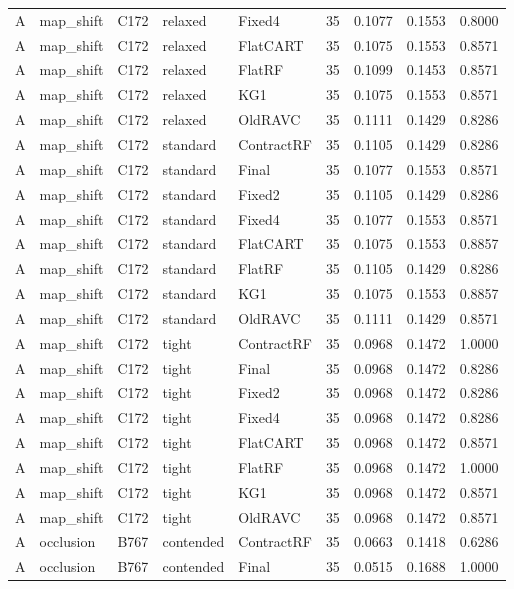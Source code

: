 \begin{longtable}{@{}lllllllll@{}}
A & map\_shift & C172 & relaxed & Fixed4 & 35 & 0.1077 & 0.1553 & 0.8000\\
A & map\_shift & C172 & relaxed & FlatCART & 35 & 0.1075 & 0.1553 & 0.8571\\
A & map\_shift & C172 & relaxed & FlatRF & 35 & 0.1099 & 0.1453 & 0.8571\\
A & map\_shift & C172 & relaxed & KG1 & 35 & 0.1075 & 0.1553 & 0.8571\\
A & map\_shift & C172 & relaxed & OldRAVC & 35 & 0.1111 & 0.1429 & 0.8286\\
A & map\_shift & C172 & standard & ContractRF & 35 & 0.1105 & 0.1429 & 0.8286\\
A & map\_shift & C172 & standard & Final & 35 & 0.1077 & 0.1553 & 0.8571\\
A & map\_shift & C172 & standard & Fixed2 & 35 & 0.1105 & 0.1429 & 0.8286\\
A & map\_shift & C172 & standard & Fixed4 & 35 & 0.1077 & 0.1553 & 0.8571\\
A & map\_shift & C172 & standard & FlatCART & 35 & 0.1075 & 0.1553 & 0.8857\\
A & map\_shift & C172 & standard & FlatRF & 35 & 0.1105 & 0.1429 & 0.8286\\
A & map\_shift & C172 & standard & KG1 & 35 & 0.1075 & 0.1553 & 0.8857\\
A & map\_shift & C172 & standard & OldRAVC & 35 & 0.1111 & 0.1429 & 0.8571\\
A & map\_shift & C172 & tight & ContractRF & 35 & 0.0968 & 0.1472 & 1.0000\\
A & map\_shift & C172 & tight & Final & 35 & 0.0968 & 0.1472 & 0.8286\\
A & map\_shift & C172 & tight & Fixed2 & 35 & 0.0968 & 0.1472 & 0.8286\\
A & map\_shift & C172 & tight & Fixed4 & 35 & 0.0968 & 0.1472 & 0.8286\\
A & map\_shift & C172 & tight & FlatCART & 35 & 0.0968 & 0.1472 & 0.8571\\
A & map\_shift & C172 & tight & FlatRF & 35 & 0.0968 & 0.1472 & 1.0000\\
A & map\_shift & C172 & tight & KG1 & 35 & 0.0968 & 0.1472 & 0.8571\\
A & map\_shift & C172 & tight & OldRAVC & 35 & 0.0968 & 0.1472 & 0.8571\\
A & occlusion & B767 & contended & ContractRF & 35 & 0.0663 & 0.1418 & 0.6286\\
A & occlusion & B767 & contended & Final & 35 & 0.0515 & 0.1688 & 1.0000\\

\end{longtable}

